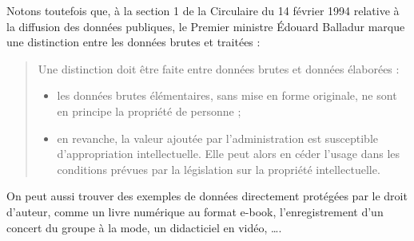 Notons toutefois que, à la section 1 de la Circulaire du 14 février
1994 relative à la diffusion des données publiques, le Premier
ministre Édouard Balladur marque une distinction entre les données
brutes et traitées :

\begin{quotation}
  Une distinction doit être faite entre données brutes et données
  élaborées :
  \begin{itemize}
  \item les données brutes élémentaires, sans mise en forme
    originale, ne sont en principe la propriété de personne ;
  \item en revanche, la valeur ajoutée par l'administration est
    susceptible d'appropriation intellectuelle. Elle peut alors en
    céder l'usage dans les conditions prévues par la législation sur
    la propriété intellectuelle.
  \end{itemize}
\end{quotation}

On peut aussi trouver des exemples de données directement protégées
par le droit d'auteur, comme un livre numérique au format e-book,
l'enregistrement d'un concert du groupe à la mode, un didacticiel en
vidéo, \dots.


